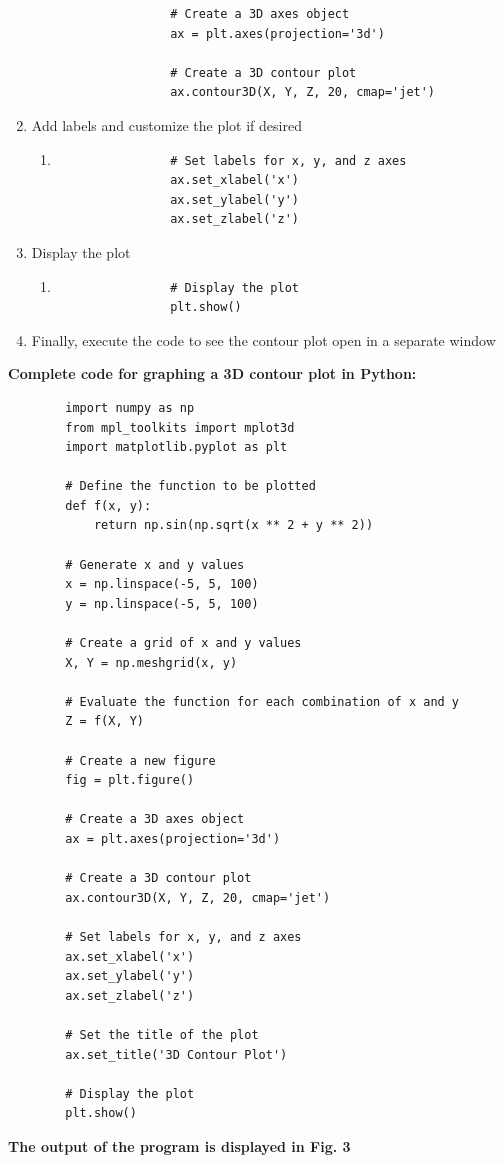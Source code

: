 \documentclass[
11pt, %
a4paper, %
oneside, %
headinclude,footinclude, %
BCOR5mm, %
]{scrartcl}
\begin{document}
\begin{enumerate}
\begin{enumerate}
\begin{verbatim}
				# Create a 3D axes object
				ax = plt.axes(projection='3d')

				# Create a 3D contour plot
				ax.contour3D(X, Y, Z, 20, cmap='jet')
			\end{verbatim}
		\end{enumerate}
		\item Add labels and customize the plot if desired
		\begin{enumerate}
			\item[] \begin{verbatim}
				# Set labels for x, y, and z axes
				ax.set_xlabel('x')
				ax.set_ylabel('y')
				ax.set_zlabel('z')
			\end{verbatim}
		\end{enumerate}
		\item Display the plot
		\begin{enumerate}
			\item[] \begin{verbatim}
				# Display the plot
				plt.show()
			\end{verbatim}
		\end{enumerate}
		\item Finally, execute the code to see the contour plot open in a separate window
	\end{enumerate}
	
	\textbf{Complete code for graphing a 3D contour plot in Python:}

	\begin{verbatim}
		import numpy as np
		from mpl_toolkits import mplot3d
		import matplotlib.pyplot as plt
		
		# Define the function to be plotted
		def f(x, y):
		    return np.sin(np.sqrt(x ** 2 + y ** 2))
		
		# Generate x and y values
		x = np.linspace(-5, 5, 100)
		y = np.linspace(-5, 5, 100)
		
		# Create a grid of x and y values
		X, Y = np.meshgrid(x, y)
		
		# Evaluate the function for each combination of x and y
		Z = f(X, Y)
		
		# Create a new figure
		fig = plt.figure()
		
		# Create a 3D axes object
		ax = plt.axes(projection='3d')
		
		# Create a 3D contour plot
		ax.contour3D(X, Y, Z, 20, cmap='jet')
		
		# Set labels for x, y, and z axes
		ax.set_xlabel('x')
		ax.set_ylabel('y')
		ax.set_zlabel('z')
		
		# Set the title of the plot
		ax.set_title('3D Contour Plot')
		
		# Display the plot
		plt.show()
	\end{verbatim}
	\textbf{The output of the program is displayed in Fig. 3}
	
\end{document}
